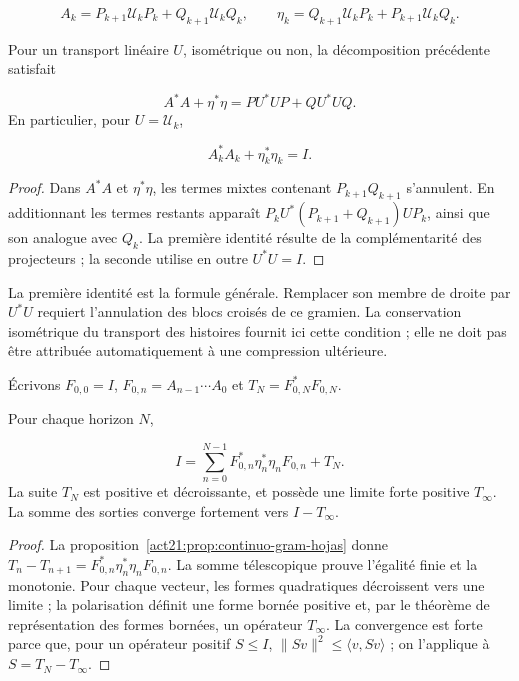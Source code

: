 \[
A_k=P_{k+1}\mathcal U_kP_k+Q_{k+1}\mathcal U_kQ_k,
\qquad
\eta_k=Q_{k+1}\mathcal U_kP_k+P_{k+1}\mathcal U_kQ_k.
\]
\begin{proposition}
\label{act21:prop:continuo-gram-hojas}
Pour un transport linéaire \(U\), isométrique ou non, la décomposition précédente satisfait

\[
A^*A+\eta^*\eta=PU^*UP+QU^*UQ.
\]
En particulier, pour \(U=\mathcal U_k\),

\[
A_k^*A_k+\eta_k^*\eta_k=I.
\]
\end{proposition}
\begin{proof}
Dans \(A^*A\) et \(\eta^*\eta\), les termes mixtes contenant \(P_{k+1}Q_{k+1}\) s'annulent. En additionnant les termes restants apparaît \(P_kU^*(P_{k+1}+Q_{k+1})UP_k\), ainsi que son analogue avec \(Q_k\). La première identité résulte de la complémentarité des projecteurs ; la seconde utilise en outre \(U^*U=I\).
\end{proof}

La première identité est la formule générale. Remplacer son membre de droite par \(U^*U\) requiert l'annulation des blocs croisés de ce gramien. La conservation isométrique du transport des histoires fournit ici cette condition ; elle ne doit pas être attribuée automatiquement à une compression ultérieure.

Écrivons \(F_{0,0}=I\), \(F_{0,n}=A_{n-1}\cdots A_0\) et \(T_N=F_{0,N}^*F_{0,N}\).

\begin{theorem}
\label{act21:thm:continuo-descomposicion-terminal}
Pour chaque horizon \(N\),

\[
I=\sum_{n=0}^{N-1}
F_{0,n}^*\eta_n^*\eta_nF_{0,n}+T_N.
\]
La suite \(T_N\) est positive et décroissante, et possède une limite forte positive \(T_\infty\). La somme des sorties converge fortement vers \(I-T_\infty\).
\end{theorem}
\begin{proof}
La proposition~\ref{act21:prop:continuo-gram-hojas} donne \(T_n-T_{n+1}=F_{0,n}^*\eta_n^*\eta_nF_{0,n}\). La somme télescopique prouve l'égalité finie et la monotonie. Pour chaque vecteur, les formes quadratiques décroissent vers une limite ; la polarisation définit une forme bornée positive et, par le théorème de représentation des formes bornées, un opérateur \(T_\infty\). La convergence est forte parce que, pour un opérateur positif \(S\leq I\), \(\|Sv\|^2\leq\langle v,Sv\rangle\) ; on l'applique à \(S=T_N-T_\infty\).
\end{proof}

